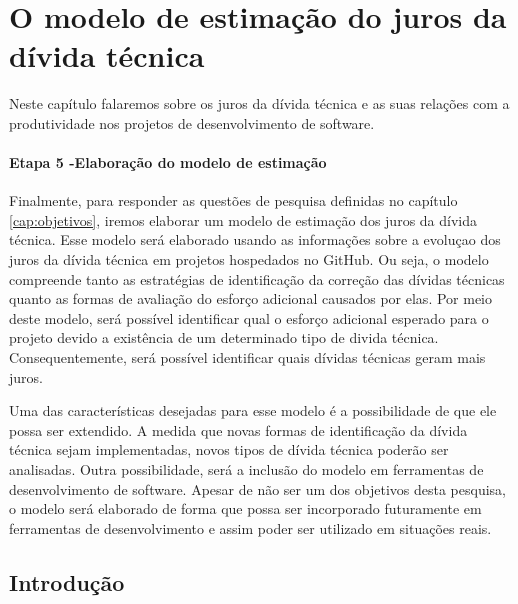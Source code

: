 \chapter{O modelo de estimação do juros da dívida técnica}
\label{estimacao:juros}

Neste capítulo falaremos sobre os juros da dívida técnica e as suas relações com a produtividade nos projetos de desenvolvimento de software.


\subsubsection{Etapa 5 -Elaboração do modelo de estimação}
\label{sec:analise_dados_modelo}

Finalmente, para responder as questões de pesquisa definidas no capítulo \ref{cap:objetivos}, iremos elaborar um modelo de estimação dos juros da dívida técnica. Esse modelo será elaborado usando as informações sobre a evoluçao dos juros da dívida técnica em projetos hospedados no GitHub. Ou seja, o modelo compreende tanto as estratégias de identificação da correção das dívidas técnicas quanto as formas de avaliação do esforço adicional causados por elas.   Por meio deste modelo, será possível identificar qual o esforço adicional esperado para o projeto devido a existência de um determinado tipo de divida técnica. Consequentemente, será possível identificar quais dívidas técnicas geram mais juros.

Uma das características desejadas para esse modelo é a possibilidade de que ele possa ser extendido.  A medida que novas formas de identificação da dívida técnica sejam implementadas, novos tipos de dívida técnica poderão ser analisadas. Outra possibilidade, será a inclusão do modelo em ferramentas de desenvolvimento de software. Apesar de não ser um dos objetivos desta pesquisa, o modelo será elaborado de forma que possa ser incorporado futuramente em ferramentas de desenvolvimento e assim poder ser utilizado em situações reais.



\section{Introdução}



